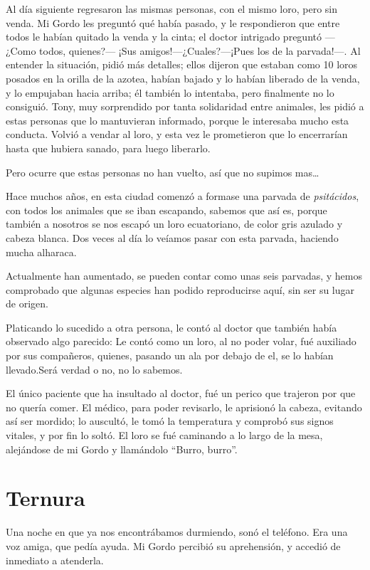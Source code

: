 \documentclass[letterpaper, 12pt]{book}
\begin{document}
Al día siguiente regresaron las mismas personas, con el mismo loro, pero sin venda. Mi Gordo les preguntó qué había pasado, y le respondieron que entre todos le habían quitado la venda y la cinta; el doctor intrigado preguntó ---¿Como todos, quienes?---
¡Sus amigos!---¿Cuales?---¡Pues los de la parvada!---. Al entender la situación, pidió más detalles; ellos dijeron que estaban como 10 loros posados en la orilla de la azotea, habían bajado y lo habían liberado de la venda, y lo empujaban hacia arriba; él también lo intentaba, pero finalmente no lo consiguió. Tony, muy sorprendido por tanta solidaridad entre animales, les pidió a estas personas que lo mantuvieran informado, porque le interesaba mucho esta conducta. Volvió a vendar al loro, y esta vez le prometieron que lo encerrarían hasta que hubiera sanado, para luego liberarlo.

Pero ocurre que estas personas no han vuelto, así que no supimos mas\ldots

Hace muchos años, en esta ciudad comenzó a formase una parvada de \textit{psitácidos}, con todos los animales que se iban escapando, sabemos que así es, porque también a nosotros se nos escapó un loro ecuatoriano, de color gris azulado y cabeza blanca. Dos veces al día lo veíamos pasar con esta parvada, haciendo mucha alharaca. 

Actualmente han aumentado, se pueden contar como unas seis parvadas, y hemos comprobado que algunas especies han podido reproducirse aquí, sin ser su lugar de origen.

Platicando lo sucedido a otra persona, le contó al doctor que también había observado algo parecido: Le contó como un loro, al no poder volar, fué auxiliado por sus compañeros, quienes, pasando un ala por debajo de el, se lo habían llevado.Será verdad o no, no lo sabemos.

El único paciente que ha insultado al doctor, fué un perico que trajeron por que no quería comer. El médico, para poder revisarlo, le aprisionó la cabeza, evitando así ser mordido; lo auscultó, le tomó la temperatura y comprobó sus signos vitales, y por fin lo soltó. El loro se fué caminando a lo largo de la mesa, alejándose de mi Gordo y llamándolo ``Burro, burro''.


\chapter{Ternura}
Una noche en que ya nos encontrábamos durmiendo, sonó el teléfono. Era una voz amiga, que pedía ayuda. Mi Gordo percibió su aprehensión, y accedió de inmediato a atenderla. 
\end{document}
